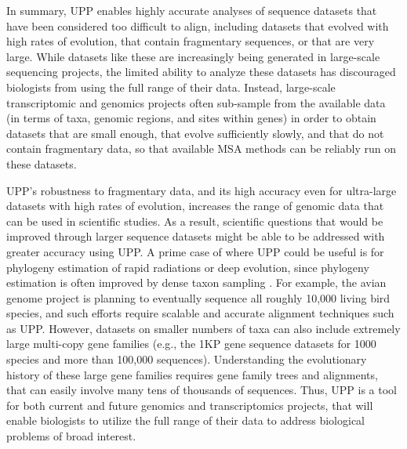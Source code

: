 In summary,  UPP enables highly accurate analyses of
sequence datasets that have been considered too difficult
to align, including
datasets that evolved with high
rates of evolution,   that
contain fragmentary sequences, or that are very large. 
While datasets
like these are increasingly being generated in large-scale
sequencing projects, 
the limited ability to analyze these datasets has discouraged
biologists from using the full range of their data. 
Instead, large-scale transcriptomic
and genomics projects often sub-sample from the available data
(in terms of taxa, genomic regions, and sites within genes)
in order to obtain datasets that are small enough, 
that evolve sufficiently slowly, and that do
not contain fragmentary data, so that 
available MSA methods can be reliably run on these datasets.

UPP's robustness to fragmentary data, and its high
accuracy even for ultra-large datasets with
high rates of evolution,  
increases the range of genomic data that can be 
used in scientific studies.
As a result, scientific questions that would be improved through 
larger sequence datasets
might be able to be addressed with greater accuracy
using UPP. A prime case of where UPP could be useful is
for phylogeny estimation of
rapid radiations or deep evolution, since phylogeny estimation
 is often improved by
dense taxon sampling \cite{zwickl_increased_2002}. 
For example, the avian genome project is planning to 
eventually sequence all roughly 10,000 living bird species,
and such efforts require scalable and accurate alignment 
techniques such as UPP. %
However, datasets
on  smaller numbers of taxa can also
include extremely large multi-copy gene families
(e.g., the 1KP  gene sequence datasets for 
1000 species and more than 100,000 sequences). 
Understanding the evolutionary history of these large gene families
requires gene family trees  and alignments, 
that can easily involve many tens of thousands of
sequences.
Thus, UPP is a tool for both current and future genomics and
transcriptomics projects, that will  enable
biologists to utilize the full range of their data to 
address biological problems of broad interest.


